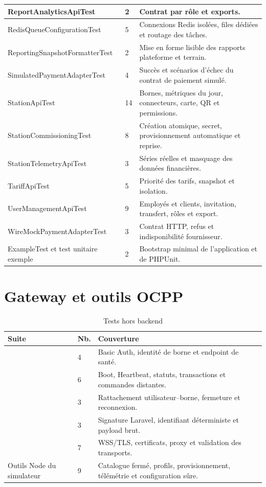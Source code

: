 \begin{longtable}{|L{5.6cm}|C{1.4cm}|L{8.0cm}|}
ReportAnalyticsApiTest & 2 & Contrat par rôle et exports. \\ \hline
RedisQueueConfigurationTest & 5 & Connexions Redis isolées, files dédiées et routage des tâches. \\ \hline
ReportingSnapshotFormatterTest & 2 & Mise en forme lisible des rapports plateforme et terrain. \\ \hline
SimulatedPaymentAdapterTest & 4 & Succès et scénarios d'échec du contrat de paiement simulé. \\ \hline
StationApiTest & 14 & Bornes, métriques du jour, connecteurs, carte, QR et permissions. \\ \hline
StationCommissioningTest & 8 & Création atomique, secret, provisionnement automatique et reprise. \\ \hline
StationTelemetryApiTest & 3 & Séries réelles et masquage des données financières. \\ \hline
TariffApiTest & 5 & Priorité des tarifs, snapshot et isolation. \\ \hline
UserManagementApiTest & 9 & Employés et clients, invitation, transfert, rôles et export. \\ \hline
WireMockPaymentAdapterTest & 3 & Contrat HTTP, refus et indisponibilité fournisseur. \\ \hline
ExampleTest et test unitaire exemple & 2 & Bootstrap minimal de l'application et de PHPUnit. \\ \hline
\end{longtable}
\normalsize

\section{Gateway et outils OCPP}

\begin{table}[H]
\centering
\caption{Tests hors backend}
\begin{tabularx}{\textwidth}{|L{4.5cm}|C{1.5cm}|Y|}
\hline
{}\textbf{Suite} & \textbf{Nb.} & \textbf{Couverture} \\ \hline
{} & 4 & Basic Auth, identité de borne et endpoint de santé. \\ \hline
{} & 6 & Boot, Heartbeat, statuts, transactions et commandes distantes. \\ \hline
{} & 3 & Rattachement utilisateur--borne, fermeture et reconnexion. \\ \hline
{} & 3 & Signature Laravel, identifiant déterministe et payload brut. \\ \hline
{} & 7 & WSS/TLS, certificats, proxy et validation des transports. \\ \hline
Outils Node du simulateur & 9 & Catalogue fermé, profils, provisionnement, télémétrie et configuration sûre. \\ \hline
\end{tabularx}
\end{table}

